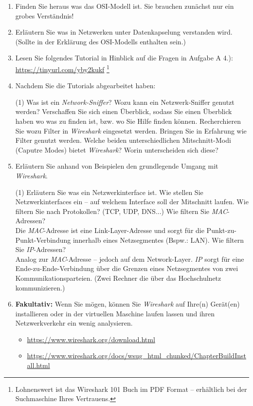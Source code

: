 \documentclass[paper=a4,fontsize=11pt]{scrartcl}%
\numberwithin{equation}{section}
\begin{document}
\begin{enumerate}
	\item Finden Sie heraus was das OSI-Modell ist. Sie brauchen zunächst nur ein grobes Verständnis!
	\item Erläutern Sie was in Netzwerken unter Datenkapselung verstanden wird. (Sollte in der Erklärung des OSI-Modells enthalten sein.)	
	\item Lesen Sie folgendes Tutorial in Hinblick auf die Fragen in Aufgabe A 4.): \url{https://tinyurl.com/yby2kukf}
	\footnote{Lohnenswert ist das Wireshark 101 Buch im PDF Format -- erhältlich bei der Suchmaschine Ihres Vertrauens.}
	\item Nachdem Sie die Tutorials abgearbeitet haben:
	\begin{tasks}(1)
		\task Was ist ein \emph{Network-Sniffer}?
		\task Wozu kann ein Netzwerk-Sniffer genutzt werden?
		\task Verschaffen Sie sich einen Überblick, sodass Sie einen Überblick haben wo was zu finden ist, bzw. wo Sie Hilfe finden können.
		\task Recherchieren Sie wozu Filter in \emph{Wireshark} eingesetzt werden.
		\task Bringen Sie in Erfahrung wie Filter genutzt werden.
		\task Welche beiden unterschiedlichen Mitschnitt-Modi (Caputre Modes) bietet \emph{Wireshark}? Worin unterscheiden sich diese?
	\end{tasks}
	\item Erläutern Sie anhand von Beispielen den grundlegende Umgang mit \emph{Wireshark}. 
	\begin{tasks}(1)
		\task Erläutern Sie was ein Netzwerkinterface ist.
		\task Wie stellen Sie Netzwerkinterfaces ein -- auf welchem Interface soll der Mitschnitt laufen.
		\task Wie filtern Sie nach Protokollen? (TCP, UDP, DNS...)
		\task Wie filtern Sie \emph{MAC}-Adressen?\\Die \emph{MAC}-Adresse ist eine Link-Layer-Adresse und sorgt für die Punkt-zu-Punkt-Verbindung innerhalb eines Netzsegmentes (Bspw.: LAN).
		\task Wie filtern Sie \emph{IP}-Adressen?\\Analog zur \emph{MAC}-Adresse -- jedoch auf dem Network-Layer. \emph{IP} sorgt für eine Ende-zu-Ende-Verbindung über die Grenzen eines Netzsegmentes von zwei Kommunikationsparteien. (Zwei Rechner die über das Hochschulnetz kommunizieren.) 
	\end{tasks}
	\item \textbf{Fakultativ:} Wenn Sie mögen, können Sie \emph{Wireshark} auf Ihre(n) Gerät(en) installieren oder in der virtuellen Maschine laufen lassen und ihren Netzwerkverkehr ein wenig analysieren. 
	\begin{itemize}
		\item \url{https://www.wireshark.org/download.html}
		\item \url{https://www.wireshark.org/docs/wsug_html_chunked/ChapterBuildInstall.html}
	\end{itemize}
\end{enumerate}
\end{document}
